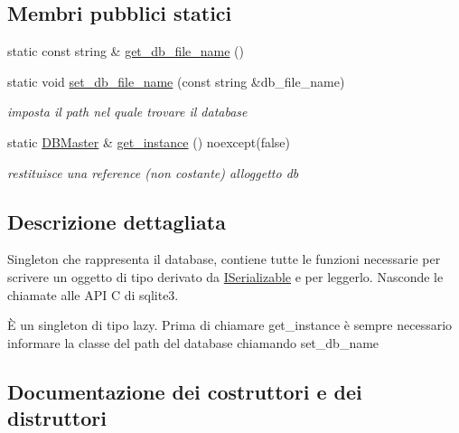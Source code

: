 \subsection*{Membri pubblici statici}
\begin{DoxyCompactItemize}
\item 
static const string \& \hyperlink{classmm_1_1_d_b_master_a65586b91e19e610db40ef1d6e81cfd4a}{get\+\_\+db\+\_\+file\+\_\+name} ()
\item 
static void \hyperlink{classmm_1_1_d_b_master_a3346d25779e18ed7ad70eed0d89347e9}{set\+\_\+db\+\_\+file\+\_\+name} (const string \&db\+\_\+file\+\_\+name)
\begin{DoxyCompactList}\small\item\em imposta il path nel quale trovare il database \end{DoxyCompactList}\item 
static \hyperlink{classmm_1_1_d_b_master}{D\+B\+Master} \& \hyperlink{classmm_1_1_d_b_master_a1f3b04e515b1999d3900353c0054f498}{get\+\_\+instance} () noexcept(false)
\begin{DoxyCompactList}\small\item\em restituisce una reference (non costante) all\textquotesingle{}oggetto db \end{DoxyCompactList}\end{DoxyCompactItemize}


\subsection{Descrizione dettagliata}
Singleton che rappresenta il database, contiene tutte le funzioni necessarie per scrivere un oggetto di tipo derivato da \hyperlink{classmm_1_1_i_serializable}{I\+Serializable} e per leggerlo. Nasconde le chiamate alle A\+PI C di sqlite3. 

È un singleton di tipo lazy. Prima di chiamare get\+\_\+instance è sempre necessario informare la classe del path del database chiamando set\+\_\+db\+\_\+name 

\subsection{Documentazione dei costruttori e dei distruttori}
\mbox{\label{classmm_1_1_d_b_master_a7571cbb3fe77a491d57595ec9bc86abf}} 
